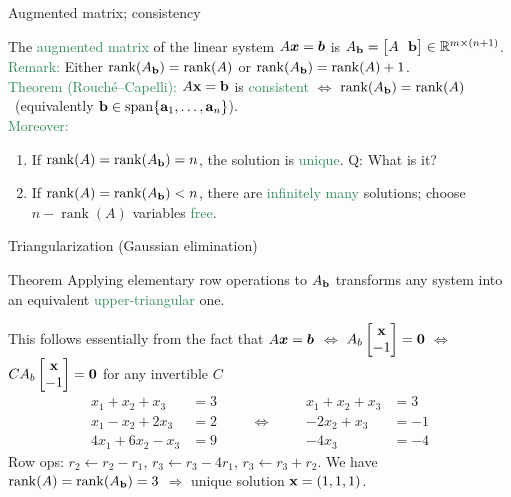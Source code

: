 \documentclass[11pt,aspectratio=169]{beamer}
\DeclareMathOperator{\rank}{rank}
\begin{document}
\begin{frame}{Augmented matrix; consistency}
 
The \textcolor{SeaGreen}{augmented matrix} of the linear system $A\boldsymbol x=\boldsymbol b$ is $A_{\bf b}=\big[A\ \ {\bf b}\big]\in\mathbb R^{m\times(n+1)}$.\\[4mm]
\textcolor{SeaGreen}{Remark:} Either $\rank(A_{\bf b})=\rank(A)$ or $\rank(A_{\bf b})=\rank(A)+1$.\\[4mm]
\textcolor{SeaGreen}{Theorem (Rouché--Capelli):} $A{\bf x}={\bf b}$ is \textcolor{SeaGreen}{consistent} $\Longleftrightarrow$ $\rank(A_{\bf b})=\rank(A)$ \ {\tiny (equivalently ${\bf b}\in\mathrm{span}\{{\bf a}_1,\ldots,{\bf a}_n\}$).}\\[6mm]

\textcolor{SeaGreen}{Moreover:}
\begin{enumerate}
\item If $\rank(A)=\rank(A_{\bf b})=n$, the solution is \textcolor{SeaGreen}{unique}. \alert{Q:} What is it?
\item If $\rank(A)=\rank(A_{\bf b})<n$, there are \textcolor{SeaGreen}{infinitely many} solutions; choose $n-\rank(A)$ variables \textcolor{SeaGreen}{free}.
\end{enumerate}
 
\end{frame}

\begin{frame}{Triangularization (Gaussian elimination)}
 \begin{alertblock}{Theorem}
Applying elementary row operations to $A_{\bf b}$ transforms any system into an equivalent \textcolor{SeaGreen}{upper-triangular} one. 	
 \end{alertblock}
 {\tiny This follows essentially from the fact that $A\boldsymbol x=\boldsymbol b$ $\Leftrightarrow$ $A_b \begin{bmatrix}
 	\mathbf{x}\\
 	-1
 \end{bmatrix}=\boldsymbol 0$ $\Leftrightarrow$ $CA_b \begin{bmatrix}
 	\mathbf{x}\\
 	-1
 \end{bmatrix}=\boldsymbol 0$ for any invertible $C$}
\[
\begin{aligned}
x_1+x_2+x_3&=3\\
x_1-x_2+2x_3&=2\\
4x_1+6x_2-x_3&=9
\end{aligned}
\qquad\Longleftrightarrow\qquad
\begin{aligned}
x_1+x_2+x_3&=3\\
-2x_2+x_3&=-1\\
-4x_3&=-4
\end{aligned}
\]
{\tiny Row ops: $r_2\!\leftarrow r_2-r_1$, $r_3\!\leftarrow r_3-4r_1$, $r_3\!\leftarrow r_3+r_2$.}
\vskip 4pt
We have $\rank(A)=\rank(A_{\bf b})=3$ $\Rightarrow$ unique solution ${\bf x}=(1,1,1)$.
 
\end{frame}
\end{document}
